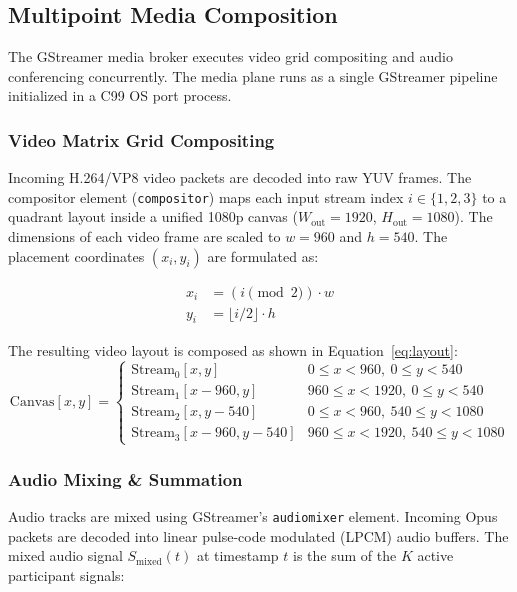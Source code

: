 \documentclass{article}
\begin{document}
\subsection{Multipoint Media Composition}

The GStreamer media broker executes video grid compositing and audio conferencing concurrently.
The media plane runs as a single GStreamer pipeline initialized in a C99 OS port process.

\subsubsection{Video Matrix Grid Compositing}

Incoming H.264/VP8 video packets are decoded into raw YUV frames. The compositor element (\texttt{compositor})
maps each input stream index $i \in \{1, 2, 3\}$ to a quadrant layout inside a unified 1080p
canvas ($W_{\text{out}} = 1920$, $H_{\text{out}} = 1080$). The dimensions of each video frame
are scaled to $w = 960$ and $h = 540$. The placement coordinates $(x_i, y_i)$ are formulated as:

\begin{align}
x_i &= (i \pmod 2) \cdot w \\
y_i &= \lfloor i / 2 \rfloor \cdot h
\end{align}

The resulting video layout is composed as shown in Equation~\ref{eq:layout}:
\begin{equation}\label{eq:layout}
\text{Canvas}[x, y] = 
\begin{cases} 
\text{Stream}_0[x, y] & 0 \le x < 960,\ 0 \le y < 540 \\
\text{Stream}_1[x - 960, y] & 960 \le x < 1920,\ 0 \le y < 540 \\
\text{Stream}_2[x, y - 540] & 0 \le x < 960,\ 540 \le y < 1080 \\
\text{Stream}_3[x - 960, y - 540] & 960 \le x < 1920,\ 540 \le y < 1080
\end{cases}
\end{equation}

\subsubsection{Audio Mixing \& Summation}

Audio tracks are mixed using GStreamer's \texttt{audiomixer} element. Incoming Opus packets are decoded
into linear pulse-code modulated (LPCM) audio buffers. The mixed audio signal $S_{\text{mixed}}(t)$ at
timestamp $t$ is the sum of the $K$ active participant signals:
\end{document}
